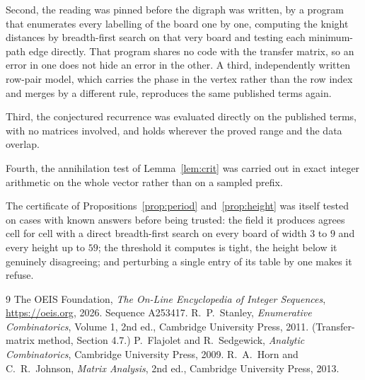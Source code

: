 \documentclass[11pt,a4paper]{article}
\theoremstyle{plain}
\theoremstyle{definition}
\begin{document}
Second, the reading was pinned before the digraph was written, by a program that enumerates
every labelling of the board one by one, computing the knight distances by breadth-first
search on that very board and testing each minimum-path edge directly. That program shares no
code with the transfer matrix, so an error in one does not hide an error in the other. A
third, independently written row-pair model, which carries the phase in the vertex rather than
the row index and merges by a different rule, reproduces the same published terms again.

Third, the conjectured recurrence was evaluated directly on the published terms, with no
matrices involved, and holds wherever the proved range and the data overlap.

Fourth, the annihilation test of Lemma~\ref{lem:crit} was carried out in exact integer
arithmetic on the whole vector rather than on a sampled prefix.

The certificate of Propositions~\ref{prop:period} and~\ref{prop:height} was itself tested
on cases with known answers before being trusted: the field it produces agrees cell for cell
with a direct breadth-first search on every board of width $3$ to $9$ and every height up to
$59$; the threshold it computes is tight, the height below it genuinely disagreeing; and
perturbing a single entry of its table by one makes it refuse.

\begin{thebibliography}{9}
 The OEIS Foundation, \emph{The On-Line Encyclopedia of Integer
Sequences}, \url{https://oeis.org}, 2026. Sequence A253417.
 R.~P.~Stanley, \emph{Enumerative Combinatorics}, Volume 1, 2nd ed.,
Cambridge University Press, 2011. (Transfer-matrix method, Section 4.7.)
 P.~Flajolet and R.~Sedgewick, \emph{Analytic Combinatorics}, Cambridge
University Press, 2009.
 R.~A.~Horn and C.~R.~Johnson, \emph{Matrix Analysis}, 2nd ed., Cambridge
University Press, 2013.
\end{thebibliography}
\end{document}
